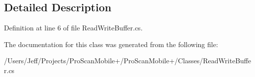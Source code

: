 \subsection{Detailed Description}


Definition at line 6 of file Read\-Write\-Buffer.\-cs.



The documentation for this class was generated from the following file\-:\begin{DoxyCompactItemize}
\item 
/\-Users/\-Jeff/\-Projects/\-Pro\-Scan\-Mobile+/\-Pro\-Scan\-Mobile+/\-Classes/Read\-Write\-Buffer.\-cs\end{DoxyCompactItemize}
